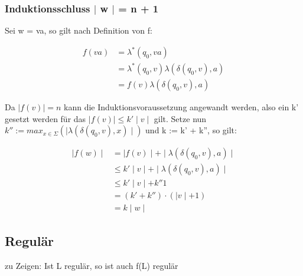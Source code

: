 \documentclass[12pt, a4paper]{article}
\begin{document}
\subsubsection*{Induktionsschluss $\mid$ w $\mid$ = n + 1}

Sei w = va, so gilt nach Definition von f:

\begin{align*}
f(va) &= \lambda^*(q_0, va) \\
&= \lambda^*(q_0, v) \lambda(\delta(q_0,v), a) \\
&= f(v)  \lambda(\delta(q_0,v), a)
\end{align*}

Da $\mid f(v) \mid = n$ kann die Induktionsvoraussetzung angewandt werden, also ein k' gesetzt werden für das $\mid f(v) \mid \le k' \mid v \mid$ gilt. Setze nun $k'' := max_{x \in \Sigma}(\mid \lambda(\delta(q_0,v),x) \mid )$ und k := k' + k'', so gilt:

\begin{align*}
\mid f(w) \mid &= \mid f(v) \mid + \mid \lambda(\delta(q_0,v),a) \mid \\
&\le k' \mid v \mid + \mid \lambda(\delta(q_0,v),a) \mid \\
&\le k' \mid v \mid + k'' 1 \\
&= (k' + k'') \cdot (\mid v \mid + 1) \\
&= k \mid w \mid
\end{align*}

\subsection*{Regulär}
zu Zeigen: Ist L regulär, so ist auch f(L) regulär
\end{document}
